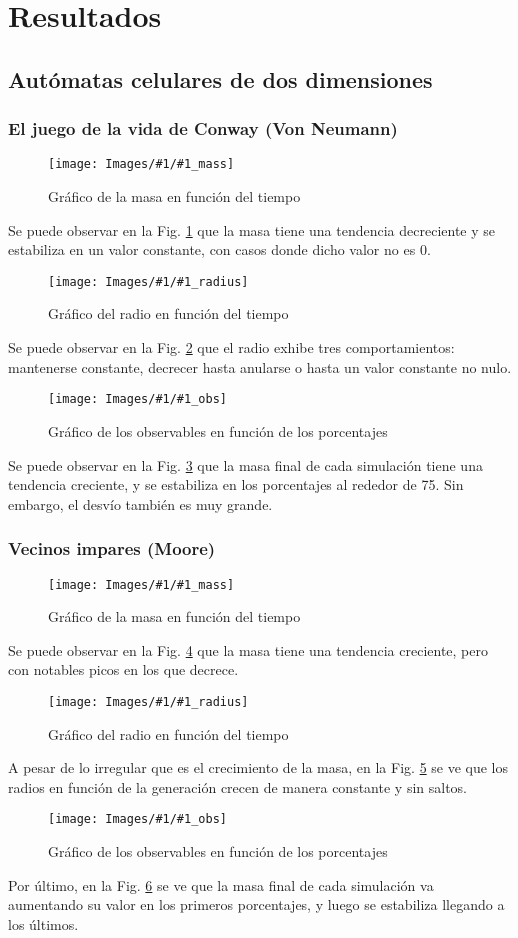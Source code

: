 \newcommand{\massgraph}[1]{
    \begin{figure}[H]
        \centering
        \texttt{[image: Images/\#1/\#1\_mass]}
        \caption{Gráfico de la masa en función del tiempo}
        \label{fig:#1mass}
    \end{figure}
}

\newcommand{\radiusgraph}[1]{
    \begin{figure}[H]
        \centering
        \texttt{[image: Images/\#1/\#1\_radius]}
        \caption{Gráfico del radio en función del tiempo}
        \label{fig:#1radius}
    \end{figure}
}

\newcommand{\obsgraph}[1]{
    \begin{figure}[H]
        \centering
        \texttt{[image: Images/\#1/\#1\_obs]}
        \caption{Gráfico de los observables en función de los porcentajes}
        \label{fig:#1obs}
    \end{figure}
}

\section{Resultados}
\label{sec:resultados}

\subsection{Autómatas celulares de dos dimensiones}
\label{subsec:results2d}
\subsubsection{El juego de la vida de Conway (Von Neumann)}
\massgraph{gol2Dv2}
Se puede observar en la Fig. \ref{fig:gol2Dv2mass} que la masa tiene una tendencia decreciente y se estabiliza en un valor constante, con casos donde dicho valor no es $0$.
\radiusgraph{gol2Dv2}
Se puede observar en la Fig. \ref{fig:gol2Dv2radius} que el radio exhibe tres comportamientos: mantenerse constante, decrecer hasta anularse o hasta un valor constante no nulo.
\obsgraph{gol2Dv2}
Se puede observar en la Fig. \ref{fig:gol2Dv2obs} que la masa final de cada simulación tiene una tendencia creciente, y se estabiliza en los porcentajes al rededor de 75. Sin embargo, el desvío también es muy grande.

\subsubsection{Vecinos impares (Moore)}
\massgraph{odd2D}
Se puede observar en la Fig. \ref{fig:odd2Dmass} que la masa tiene una tendencia creciente, pero con notables picos en los que decrece.
\radiusgraph{odd2D}
A pesar de lo irregular que es el crecimiento de la masa, en la Fig. \ref{fig:odd2Dradius} se ve que los radios en función de la generación crecen de manera constante y sin saltos.
\obsgraph{odd2D}
Por último, en la Fig. \ref{fig:odd2Dobs} se ve que la masa final de cada simulación va aumentando su valor en los primeros porcentajes, y luego se estabiliza llegando a los últimos.

